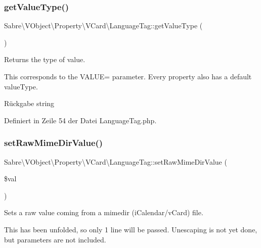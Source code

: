 \subsubsection{\texorpdfstring{get\+Value\+Type()}{getValueType()}}
{\footnotesize\ttfamily Sabre\textbackslash{}\+V\+Object\textbackslash{}\+Property\textbackslash{}\+V\+Card\textbackslash{}\+Language\+Tag\+::get\+Value\+Type (\begin{DoxyParamCaption}{ }\end{DoxyParamCaption})}

Returns the type of value.

This corresponds to the V\+A\+L\+UE= parameter. Every property also has a \textquotesingle{}default\textquotesingle{} value\+Type.

\begin{DoxyReturn}{Rückgabe}
string 
\end{DoxyReturn}


Definiert in Zeile 54 der Datei Language\+Tag.\+php.

\mbox{\label{class_sabre_1_1_v_object_1_1_property_1_1_v_card_1_1_language_tag_ad9ca03a0f6306ae75120a612cb7c0933}} 
\subsubsection{\texorpdfstring{set\+Raw\+Mime\+Dir\+Value()}{setRawMimeDirValue()}}
{\footnotesize\ttfamily Sabre\textbackslash{}\+V\+Object\textbackslash{}\+Property\textbackslash{}\+V\+Card\textbackslash{}\+Language\+Tag\+::set\+Raw\+Mime\+Dir\+Value (\begin{DoxyParamCaption}\item[{}]{\$val }\end{DoxyParamCaption})}

Sets a raw value coming from a mimedir (i\+Calendar/v\+Card) file.

This has been \textquotesingle{}unfolded\textquotesingle{}, so only 1 line will be passed. Unescaping is not yet done, but parameters are not included.


